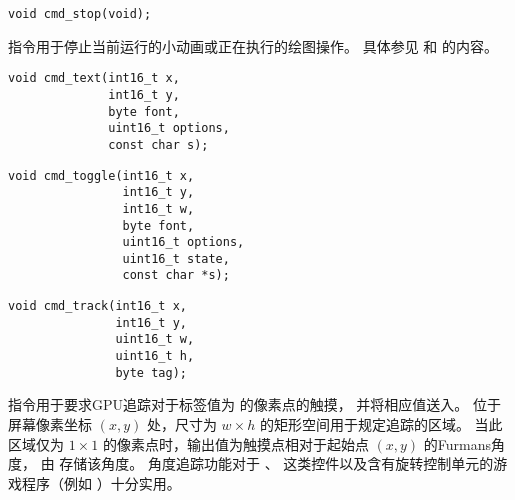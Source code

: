 
\begin{framed}
\begin{verbatim}
void cmd_stop(void);
\end{verbatim}
\end{framed}

 指令用于停止当前运行的小动画或正在执行的绘图操作。
具体参见  和  的内容。



\begin{framed}
\begin{verbatim}
void cmd_text(int16_t x,
              int16_t y,
              byte font,
              uint16_t options,
              const char s);
\end{verbatim}
\end{framed}



\begin{framed}
\begin{verbatim}
void cmd_toggle(int16_t x,
                int16_t y,
                int16_t w,
                byte font,
                uint16_t options,
                uint16_t state,
                const char *s);
\end{verbatim}
\end{framed}




\begin{framed}
\begin{verbatim}
void cmd_track(int16_t x,
               int16_t y,
               uint16_t w,
               uint16_t h,
               byte tag);
\end{verbatim}
\end{framed}

 指令用于要求GPU追踪对于标签值为  的像素点的触摸，
并将相应值送入。
位于屏幕像素坐标 $(x, y)$ 处，尺寸为 $w \times h$ 的矩形空间用于规定追踪的区域。
当此区域仅为 $1 \times 1$ 的像素点时，输出值为触摸点相对于起始点 $(x, y)$ 的Furmans角度，
由   存储该角度。
角度追踪功能对于  、  这类控件以及含有旋转控制单元的游戏程序（例如  ）十分实用。

